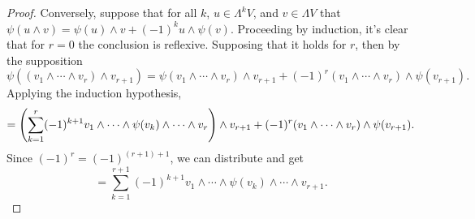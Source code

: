 \documentclass{article}
\begin{document}
\begin{proof}
  Conversely, suppose that for all $k$, $u \in \Lambda^{k}V$, and $v \in \Lambda V$ that $\psi(u \wedge v) = \psi(u) \wedge v
  + (-1)^{k}u \wedge \psi(v)$.
  Proceeding by induction, it's clear that for $r = 0$ the conclusion is reflexive.
  Supposing that it holds for $r$, then by the supposition
  \[
    \psi((v_{1} \wedge \cdots \wedge v_{r}) \wedge v_{r+1}) = \psi(v_{1} \wedge \cdots \wedge v_{r}) \wedge v_{r+1}
    + (-1)^{r}(v_{1} \wedge \cdots \wedge v_{r}) \wedge \psi(v_{r+1}).
  \]
  Applying the induction hypothesis,
  \[
    = \qty(\sum_{k = 1}^{r}(-1)^{k+1}v_{1} \wedge \cdots \wedge \psi(v_{k}) \wedge \cdots \wedge v_{r}) \wedge v_{r+1}
    + (-1)^{r}(v_{1} \wedge \cdots \wedge v_{r}) \wedge \psi(v_{r+1}).
  \]
  Since $(-1)^{r} = (-1)^{(r+1)+1}$, we can distribute and get
  \[
    = \sum_{k = 1}^{r+1}(-1)^{k+1}v_{1} \wedge \cdots \wedge \psi(v_{k}) \wedge \cdots \wedge v_{r+1}.
  \]
\end{proof}
\end{document}
